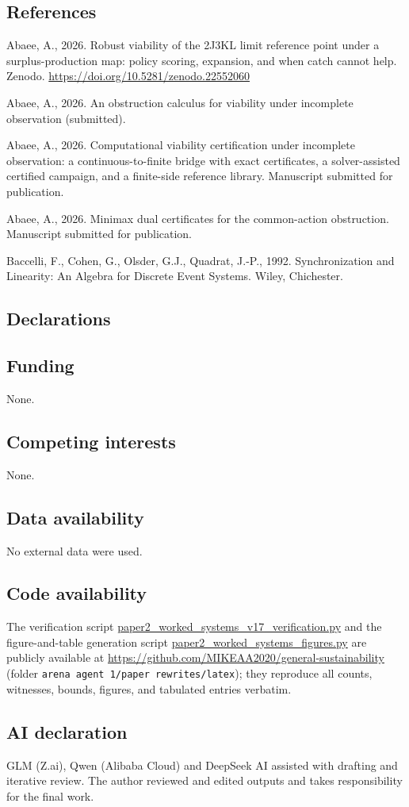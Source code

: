\documentclass[10pt,twocolumn]{article}
\theoremstyle{definition}
\begin{document}
\subsection*{References}

Abaee, A., 2026. Robust viability of the 2J3KL limit reference point
under a surplus-production map: policy scoring, expansion, and when
catch cannot help. Zenodo.
\url{https://doi.org/10.5281/zenodo.22552060}

Abaee, A., 2026. An obstruction calculus for viability under
incomplete observation (submitted).

Abaee, A., 2026. Computational viability certification under incomplete
observation: a continuous-to-finite bridge with exact certificates, a
solver-assisted certified campaign, and a finite-side reference library.
Manuscript submitted for publication.

Abaee, A., 2026. Minimax dual certificates for the common-action
obstruction. Manuscript submitted for publication.

Baccelli, F., Cohen, G., Olsder, G.J., Quadrat, J.-P., 1992.
Synchronization and Linearity: An Algebra for Discrete Event Systems.
Wiley, Chichester.

\subsection*{Declarations}

\subsection*{Funding}
None.

\subsection*{Competing interests}
None.

\subsection*{Data availability}
No external data were used.

\subsection*{Code availability}
The verification script \url{paper2_worked_systems_v17_verification.py}
and the figure-and-table generation script
\url{paper2_worked_systems_figures.py} are publicly available at
\url{https://github.com/MIKEAA2020/general-sustainability} (folder
\texttt{arena agent 1/paper rewrites/latex}); they reproduce all
counts, witnesses, bounds, figures, and tabulated entries verbatim.

\subsection*{AI declaration}
GLM (Z.ai), Qwen (Alibaba Cloud) and DeepSeek AI assisted with drafting
and iterative review. The author reviewed and edited outputs and takes
responsibility for the final work.
\end{document}
